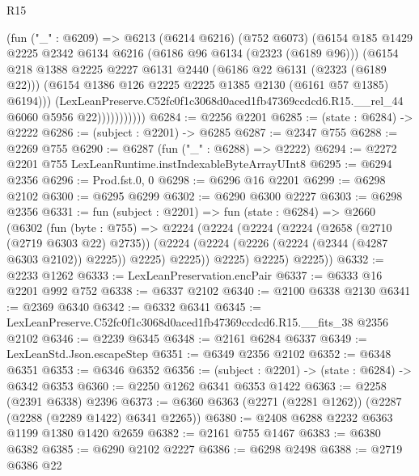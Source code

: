\begin{lexlean}{R15}
\begin{coremodule}
                      (fun ("_" : @6209) =>
                      @6213
                        (@6214 @6216)
                        (@752 @6073)
                        (@6154
                          @185
                          @1429
                          @2225
                          @2342
                          @6134
                          @6216
                          (@6186 @96 @6134 (@2323 (@6189 @96)))
                          (@6154
                            @218
                            @1388
                            @2225
                            @2227
                            @6131
                            @2440
                            (@6186 @22 @6131 (@2323 (@6189 @22)))
                            (@6154 @1386 @126 @2225 @2225 @1385 @2130 (@6161 @57 @1385) @6194)))
                        (LexLeanPreserve.C52fc0f1c3068d0aced1fb47369ccdcd6.R15.__rel_44
                          @6060
                          @5956
                          @22)))))))))))
@6284 := @2256 @2201
@6285 := (state : @6284) -> @2222
@6286 := (subject : @2201) -> @6285
@6287 := @2347 @755
@6288 := @2269 @755
@6290 := @6287 (fun ("_" : @6288) => @2222)
@6294 := @2272 @2201 @755 LexLeanRuntime.instIndexableByteArrayUInt8
@6295 := @6294 @2356
@6296 := Prod.fst.{0, 0}
@6298 := @6296 @16 @2201
@6299 := @6298 @2102
@6300 := @6295 @6299
@6302 := @6290 @6300 @2227
@6303 := @6298 @2356
@6331 := fun (subject : @2201) =>
  fun (state : @6284) =>
  @2660
    (@6302
      (fun (byte : @755) =>
      @2224
        (@2224
          (@2224
            (@2224
              (@2658 (@2710 (@2719 @6303 @22) @2735))
              (@2224 (@2224 (@2226 (@2224 (@2344 (@4287 @6303 @2102)) @2225)) @2225) @2225))
            @2225)
          @2225)
        @2225))
@6332 := @2233 @1262
@6333 := LexLeanPreservation.encPair
@6337 := @6333 @16 @2201 @992 @752
@6338 := @6337 @2102
@6340 := @2100 @6338 @2130
@6341 := @2369 @6340
@6342 := @6332 @6341
@6345 := LexLeanPreserve.C52fc0f1c3068d0aced1fb47369ccdcd6.R15.__fits_38 @2356 @2102
@6346 := @2239 @6345
@6348 := @2161 @6284 @6337
@6349 := LexLeanStd.Json.escapeStep
@6351 := @6349 @2356 @2102
@6352 := @6348 @6351
@6353 := @6346 @6352
@6356 := (subject : @2201) -> (state : @6284) -> @6342 @6353
@6360 := @2250 @1262 @6341 @6353 @1422
@6363 := @2258 (@2391 @6338) @2396
@6373 := @6360 @6363 (@2271 (@2281 @1262)) (@2287 (@2288 (@2289 @1422) @6341 @2265))
@6380 := @2408 @6288 @2232 @6363 @1199 @1380 @1420 @2659
@6382 := @2161 @755 @1467
@6383 := @6380 @6382
@6385 := @6290 @2102 @2227
@6386 := @6298 @2498
@6388 := @2719 @6386 @22

\end{coremodule}
\end{lexlean}
